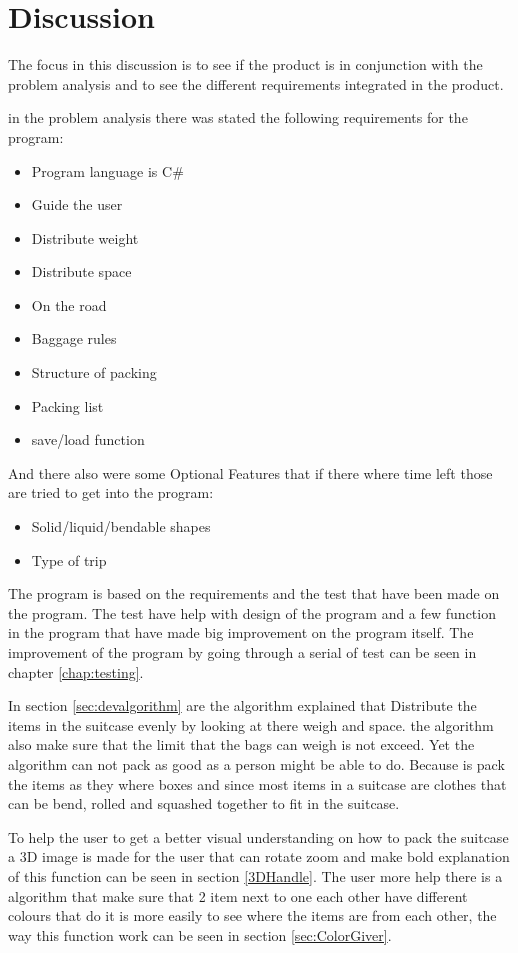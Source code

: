 \section{Discussion}
The focus in this discussion is to see if the product is in conjunction with the problem analysis and to see the different requirements integrated in the product.

in the problem analysis there was stated the following requirements for the program:

\begin{itemize}
\item Program language is C\#
\item Guide the user
\item Distribute weight
\item Distribute space
\item On the road
\item Baggage rules
\item Structure of packing
\item Packing list
\item save/load function
\end{itemize}

And there also were some Optional Features that if there where time left those are tried to get into the program:
\begin{itemize}
\item Solid/liquid/bendable shapes
\item Type of trip
\end{itemize}

The program is based on the requirements and the test that have been made on the program. The test have help with design of the program and a few function in the program that have made big improvement on the program itself. The improvement of the program by going through a serial of test can be seen in chapter \ref{chap:testing}.

In section \ref{sec:devalgorithm} are the algorithm explained that Distribute the items in the suitcase evenly by looking at there weigh and space. the algorithm also make sure that the limit that the bags can weigh is not exceed. Yet the algorithm can not pack as good as a person might be able to do. Because is pack the items as they where boxes and since most items in a suitcase are clothes that can be bend, rolled and squashed together to fit in the suitcase.

To help the user to get a better visual understanding on how to pack the suitcase a 3D image is made for the user that can rotate zoom and make bold explanation of this function can be seen in section \ref{3DHandle}. The user more help there is a algorithm that make sure that 2 item next to one each other have different colours that do it is more easily to see where the items are from each other, the way this function work can be seen in section \ref{sec:ColorGiver}.

